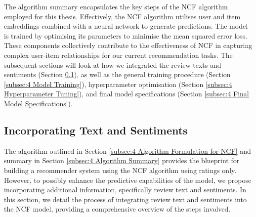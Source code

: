 The algorithm summary encapsulates the key steps of the NCF algorithm employed for this thesis. Effectively, the NCF algorithm utilises user and item embeddings combined with a neural network to generate predictions. The model is trained by optimising its parameters to minimise the mean squared error loss. These components collectively contribute to the effectiveness of NCF in capturing complex user-item relationships for our current recommendation tasks. The subsequent sections will look at how we integrated the review texts and sentiments (Section \ref{subsec:4 Incorporating Text and Sentiments}), as well as the general training procedure (Section \ref{subsec:4 Model Training}), hyperparameter optimisation (Section \ref{subsec:4 Hyperparameter Tuning}), and final model specifications (Section \ref{subsec:4 Final Model Specifications}).


\subsection{Incorporating Text and Sentiments}
\label{subsec:4 Incorporating Text and Sentiments}

The algorithm outlined in Section \ref{subsec:4 Algorithm Formulation for NCF} and summary in Section \ref{subsec:4 Algorithm Summary} provides the blueprint for building a recommender system using the NCF algorithm using ratings only. However, to possibly enhance the predictive capabilities of the model, we propose incorporating additional information, specifically review text and sentiments. In this section, we detail the process of integrating review text and sentiments into the NCF model, providing a comprehensive overview of the steps involved. 

